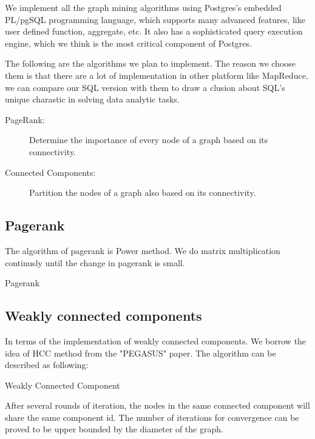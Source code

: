 We implement all the graph mining algorithms using Postgres's embedded PL/pgSQL programming language, which supports many advanced features, like user defined function, aggregate, etc. It also has a sophisticated query execution engine, which we think is the most critical component of Postgres.

The following are the algorithms we plan to implement. The reason we choose them is that there are a lot of implementation in other platform like MapReduce, we can compare our SQL version with them to draw a clusion about SQL's unique charastic in solving data analytic tasks.

\begin{description}
  \item[PageRank:] Determine the importance of every node of a graph based on its connectivity. 
  \item[Connected Components:] Partition the nodes of a graph also based on its connectivity.
\end{description}

\subsection{Pagerank}
The algorithm of pagerank is Power method. We do matrix multiplication continusly until the change in pagerank is small. 
\begin{algorithm}
\caption{Pagerank}
\begin{algorithmic}
\REPEAT
{}
\end{algorithmic}
\end{algorithm}

\subsection{Weakly connected components}
In terms of the implementation of weakly connected components. We borrow the idea of HCC method from the "PEGASUS" paper.\cite{Kang09}
The algorithm can be described as following:
\begin{algorithm}
\caption{Weakly Connected Component}
\begin{algorithmic}
\REPEAT
{}
\end{algorithmic}
\end{algorithm}

After several rounds of iteration, the nodes in the same connected component will share the same component id.
The number of iterations for convergence can be proved to be upper bounded by the diameter of the graph.
